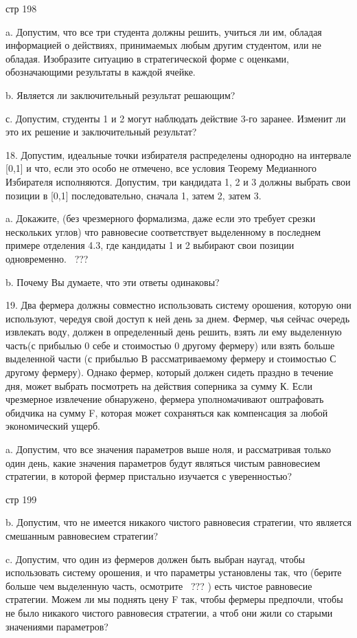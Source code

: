 \documentclass[a4paper,12pt]{article}
\begin{document}
стр 198

a. Допустим, что все три студента должны решить,
учиться ли им, обладая информацией о действиях,
принимаемых любым другим студентом, или не обладая.
Изобразите ситуацию в стратегической форме с
оценками, обозначающими результаты в каждой ячейке.

b. Является ли заключительный результат решающим?

с. Допустим, студенты 1 и 2 могут наблюдать
действие 3-го заранее. Изменит ли это их решение и
заключительный результат?

18. Допустим, идеальные точки избирателя
распределены однородно на интервале [0,1] и что,
если это особо не отмечено, все условия Теорему
Медианного Избирателя исполняются. Допустим, три
кандидата 1, 2 и 3 должны выбрать свои позиции в
[0,1] последовательно, сначала 1, затем 2, затем 3.

a. Докажите, (без чрезмерного формализма, даже если
это требует срезки нескольких углов) что равновесие
соответствует выделенному в последнем примере
отделения 4.3, где кандидаты 1 и 2 выбирают свои
позиции одновременно. \ ???

b. Почему Вы думаете, что эти ответы одинаковы?

19. Два фермера должны совместно использовать
систему орошения, которую они используют, чередуя
свой доступ к ней день за днем. Фермер, чья сейчас
очередь извлекать воду, должен в определенный день
решить, взять ли ему выделенную часть(с прибылью 0
себе и стоимостью 0 другому фермеру) или взять
больше выделенной части (с прибылью В
рассматриваемому фермеру и стоимостью С другому
фермеру). Однако фермер, который должен сидеть
праздно в течение дня, может выбрать посмотреть на
действия соперника за сумму К. Если чрезмерное
извлечение обнаружено, фермера уполномачивают
оштрафовать обидчика на сумму F, которая может
сохраняться как компенсация за любой экономический
ущерб.

a. Допустим, что все значения параметров выше ноля,
и рассматривая только один день, какие значения
параметров будут являться чистым равновесием
стратегии, в которой фермер пристально изучается с
уверенностью?

стр 199

b. Допустим, что не имеется никакого чистого
равновесия стратегии, что является смешанным
равновесием стратегии?

c. Допустим, что один из фермеров должен быть
выбран наугад, чтобы использовать систему орошения,
и что параметры установлены так, что (берите больше
чем выделенную часть, осмотрите \ ??? ) есть чистое
равновесие стратегии. Можем ли мы поднять цену F
так, чтобы фермеры предпочли, чтобы не было
никакого чистого равновесия стратегии, а чтоб они
жили со старыми значениями параметров?
\end{document}

